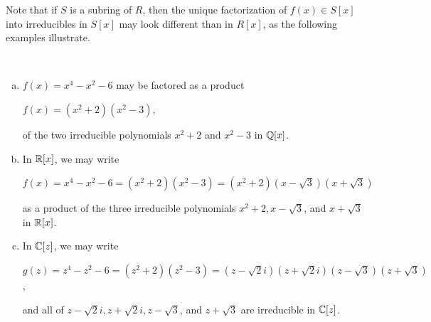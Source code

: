 \documentclass[11pt,fleqn,dvipsnames,usenames]{article}
\newcommand{\p}{\noindent}
\begin{document}
\vsp

%
\p Note that if $S$ is a subring of $R$, then the unique factorization of $f(x)\in S[x]$ into irreducibles in $S[x]$ may look different than in $R[x]$, as the following examples illustrate.
\vsp

\begin{examples}~
\begin{enumerate}[(a)]
\item $f(x) = x^4 - x^2 - 6$ may be factored as a product
\begin{center}
$f(x) = (x^2 + 2)(x^2 - 3)$,
\end{center}
of the two irreducible polynomials $x^2 + 2$ and $x^2 - 3$ in $\mathbb{Q}[x]$.
\item In $\mathbb{R}[x]$, we may write
\begin{center}
$f(x) = x^4 - x^2 - 6 = (x^2 + 2)(x^2 - 3) = (x^2 + 2)(x - \sqrt{3})(x + \sqrt{3})$
\end{center}
as a product of the three irreducible polynomials $x^2 + 2, x - \sqrt{3}$, and $x+\sqrt{3}$ in $\mathbb{R}[x]$.
\item In $\mathbb{C}[z]$, we may write
\begin{center}
$g(z) = z^4 - z^2 - 6 = (z^2 + 2)(z^2 - 3) = (z-\sqrt{2}i)(z + \sqrt{2}i)(z - \sqrt{3})(z + \sqrt{3})$,
\end{center}
and all of $z-\sqrt{2}i, z + \sqrt{2}i, z - \sqrt{3}$, and $z + \sqrt{3}$ are irreducible in $\mathbb{C}[z]$.
\end{enumerate}
\end{examples}
\end{document}

